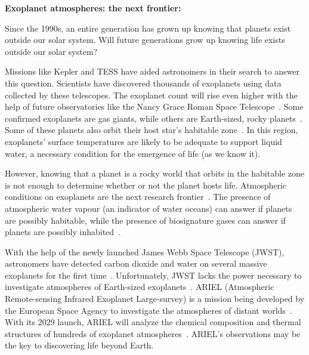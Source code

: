 \textbf{Exoplanet atmospheres: the next frontier:}

Since the 1990s, an entire generation has grown up knowing that planets exist outside our solar system. Will future generations grow up knowing life exists outside our solar system?

Missions like Kepler and TESS have aided astronomers in their search to answer this question. Scientists have discovered thousands of exoplanets using data collected by these telescopes.
The exoplanet count will rise even higher with the help of future observatories like the Nancy Grace Roman Space Telescope~\cite{johnson2020predictions}.
Some confirmed exoplanets are gas giants, while others are Earth-sized, rocky planets~\cite{Stassun:2018:AJ, Guerrero:2021:ApJS}. 
Some of these planets also orbit their host star’s habitable zone~\cite{Gillon:2017:Natur, Wolf:2017:ApJL, Agol:2021:PSJ, Zechmeister:2019:AA}.
In this region, exoplanets' surface temperatures are likely to be adequate to support liquid water, a necessary condition for the emergence of life (as we know it).

However, knowing that a planet is a rocky world that orbits in the habitable zone is not enough to determine whether or not the planet hosts life.
Atmospheric conditions on exoplanets are the next research frontier~\cite{seager2010exoplanet}.
The presence of atmospheric water vapour (an indicator of water oceans) can answer if planets are possibly habitable, while the presence of biosignature gases can answer if planets are possibly inhabited~\cite{seager2010exoplanet}.

With the help of the newly launched James Webb Space Telescope (JWST), astronomers have detected carbon dioxide and water on several massive exoplanets for the first time~\cite{gardner2006james, early2022identification, pontoppidan2022jwst}.
Unfortunately, JWST lacks the power necessary to investigate atmospheres of Earth-sized exoplanets~\cite{pontoppidan2022jwst}.
ARIEL (Atmospheric Remote-sensing Infrared Exoplanet Large-survey) is a mission being developed by the European Space Agency to investigate the atmospheres of distant worlds~\cite{puig2016ariel}.
With its 2029 launch, ARIEL will analyze the chemical composition and thermal structures of hundreds of exoplanet atmospheres~\cite{puig2016ariel}.
ARIEL's observations may be the key to discovering life beyond Earth.

